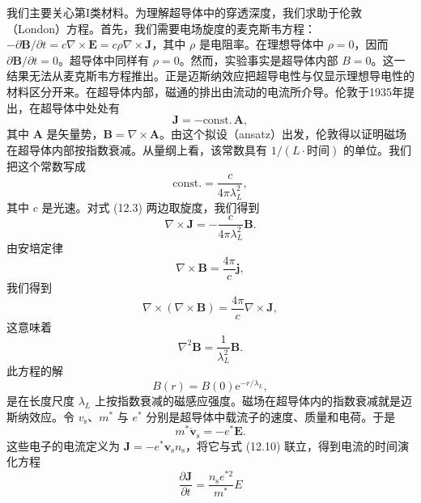 我们主要关心第I类材料。为理解超导体中的穿透深度，我们求助于伦敦（London）方程。首先，我们需要电场旋度的麦克斯韦方程：$-\partial\mathbf{B}/\partial t=c\nabla\times\mathbf{E}=c\rho\nabla\times\mathbf{J}$，其中 $\rho$ 是电阻率。在理想导体中 $\rho=0$，因而 $\partial\mathbf{B}/\partial t=0$。超导体中同样有 $\rho=0$。然而，实验事实是超导体内部 $B=0$。这一结果无法从麦克斯韦方程推出。正是迈斯纳效应把超导电性与仅显示理想导电性的材料区分开来。在超导体内部，磁通的排出由流动的电流所介导。伦敦于1935年提出，在超导体中处处有
\begin{equation*}
\mathbf{J}=-\mathrm{const.}\,\mathbf{A},\tag{12.3}
\end{equation*}
其中 $\mathbf{A}$ 是矢量势，$\mathbf{B}=\nabla\times\mathbf{A}$。由这个拟设（ansatz）出发，伦敦得以证明磁场在超导体内部按指数衰减。从量纲上看，该常数具有 $1/(L\cdot\text{时间})$ 的单位。我们把这个常数写成
\begin{equation*}
\mathrm{const.}=\frac{c}{4\pi\lambda_{L}^{2}},\tag{12.4}
\end{equation*}
其中 $c$ 是光速。对式 (12.3) 两边取旋度，我们得到
\begin{equation*}
\nabla\times\mathbf{J}=-\frac{c}{4\pi\lambda_{L}^{2}}\mathbf{B}.\tag{12.5}
\end{equation*}
由安培定律
\begin{equation*}
\nabla\times\mathbf{B}=\frac{4\pi}{c}\mathbf{j},\tag{12.6}
\end{equation*}
我们得到
\begin{equation*}
\nabla\times\left(\nabla\times\mathbf{B}\right)=\frac{4\pi}{c}\nabla\times\mathbf{J},\tag{12.7}
\end{equation*}
这意味着
\begin{equation*}
\nabla^{2}\mathbf{B}=\frac{1}{\lambda_{L}^{2}}\mathbf{B}.\tag{12.8}
\end{equation*}
此方程的解
\begin{equation*}
B(r)=B(0)\mathrm{e}^{-r/\lambda_{L}},\tag{12.9}
\end{equation*}
是在长度尺度 $\lambda_{L}$ 上按指数衰减的磁感应强度。磁场在超导体内的指数衰减就是迈斯纳效应。令 $v_{\mathrm{s}}$、$m^{*}$ 与 $e^{*}$ 分别是超导体中载流子的速度、质量和电荷。于是
\begin{equation*}
m^{*}\dot{\mathbf{v}}_{\mathrm{s}}=-e^{*}\mathbf{E}.\tag{12.10}
\end{equation*}
这些电子的电流定义为 $\mathbf{J}=-e^{*}\mathbf{v}_{\mathrm{s}}n_{\mathrm{s}}$，将它与式 (12.10) 联立，得到电流的时间演化方程
\begin{equation*}
\frac{\partial\mathbf{J}}{\partial t}=\frac{n_{\mathrm{s}}e^{*2}}{m^{*}}E\tag{12.11}
\end{equation*}
